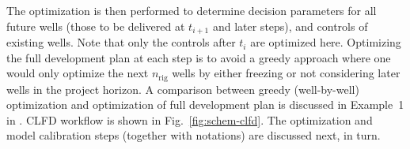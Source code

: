 \documentclass[11pt]{article}
\begin{document}
The optimization is then performed to determine decision parameters
for all future wells (those to be delivered at $t_{i+1}$ and later steps), and controls
of existing wells. Note that only the controls after $t_{i}$ are optimized here.
Optimizing the full development plan at each step is to avoid
a greedy approach where one would only optimize the next $n_{\text{rig}}$ wells
by either freezing or not considering later wells in the project horizon.
A comparison between greedy (well-by-well) optimization and optimization of full development plan is discussed in Example~1 in \citet{shirangi:15b}.
CLFD workflow is shown in Fig.~\ref{fig:schem-clfd}. The optimization and model calibration steps
(together with notations) are discussed next, in turn.

%
\end{document}
